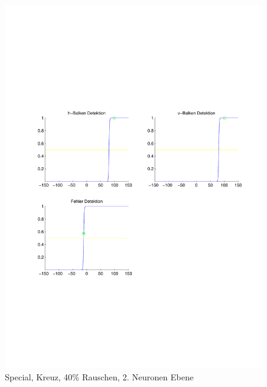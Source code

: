 \begin{figure}[hbt]
\begin{minipage}{0.8 \textwidth}
		\includegraphics[width=\textwidth]{./Bilder/Auswertung/Endergebnis/TypeSpecial_Rauschen40_Cross_Layer2}
		\caption{Special, Kreuz, 40\% Rauschen, 2. Neuronen Ebene}
		\label{Special_Kreuz_40_2}
	\end{minipage}
\end{figure}

